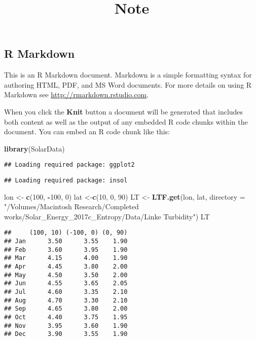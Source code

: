 \documentclass[twocolumn]{article}
\title{Note}
\author{}
\date{}
\newenvironment{Shaded}{\begin{snugshade}}{\end{snugshade}}
\newcommand{\KeywordTok}[1]{\textcolor[rgb]{0.13,0.29,0.53}{\textbf{#1}}}
\newcommand{\DataTypeTok}[1]{\textcolor[rgb]{0.13,0.29,0.53}{#1}}
\newcommand{\DecValTok}[1]{\textcolor[rgb]{0.00,0.00,0.81}{#1}}
\newcommand{\StringTok}[1]{\textcolor[rgb]{0.31,0.60,0.02}{#1}}
\newcommand{\OperatorTok}[1]{\textcolor[rgb]{0.81,0.36,0.00}{\textbf{#1}}}
\newcommand{\NormalTok}[1]{#1}
\begin{document}
\maketitle

\subsection{R Markdown}\label{r-markdown}

This is an R Markdown document. Markdown is a simple formatting syntax
for authoring HTML, PDF, and MS Word documents. For more details on
using R Markdown see \url{http://rmarkdown.rstudio.com}.

When you click the \textbf{Knit} button a document will be generated
that includes both content as well as the output of any embedded R code
chunks within the document. You can embed an R code chunk like this:

\begin{Shaded}
\begin{Highlighting}[]
\KeywordTok{library}\NormalTok{(SolarData)}
\end{Highlighting}
\end{Shaded}

\begin{verbatim}
## Loading required package: ggplot2
\end{verbatim}

\begin{verbatim}
## Loading required package: insol
\end{verbatim}

\begin{Shaded}
\begin{Highlighting}[]
\NormalTok{lon <-}\StringTok{ }\KeywordTok{c}\NormalTok{(}\DecValTok{100}\NormalTok{, }\OperatorTok{-}\DecValTok{100}\NormalTok{, }\DecValTok{0}\NormalTok{)}
\NormalTok{lat <-}\KeywordTok{c}\NormalTok{(}\DecValTok{10}\NormalTok{, }\DecValTok{0}\NormalTok{, }\DecValTok{90}\NormalTok{)}
\NormalTok{LT <-}\StringTok{ }\KeywordTok{LTF.get}\NormalTok{(lon, lat, }\DataTypeTok{directory =} \StringTok{"/Volumes/Macintosh Research/Completed works/Solar_Energy_2017c_Entropy/Data/Linke Turbidity"}\NormalTok{)}
\NormalTok{LT}
\end{Highlighting}
\end{Shaded}

\begin{verbatim}
##     (100, 10) (-100, 0) (0, 90)
## Jan      3.50      3.55    1.90
## Feb      3.60      3.95    1.90
## Mar      4.15      4.00    1.90
## Apr      4.45      3.80    2.00
## May      4.50      3.50    2.00
## Jun      4.55      3.65    2.05
## Jul      4.60      3.35    2.10
## Aug      4.70      3.30    2.10
## Sep      4.65      3.80    2.00
## Oct      4.40      3.75    1.95
## Nov      3.95      3.60    1.90
## Dec      3.90      3.55    1.90
\end{verbatim}
\end{document}
